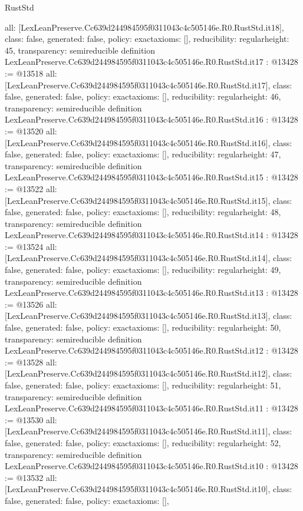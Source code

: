 \begin{lexlean}{RustStd}
\begin{coremodule}
{  all: [LexLeanPreserve.Cc639d244984595f0311043c4c505146e.R0.RustStd.it18],
  class: false,
  generated: false,
  policy: exact{axioms: []},
  reducibility: regular{height: 45},
  transparency: semireducible
}
definition LexLeanPreserve.Cc639d244984595f0311043c4c505146e.R0.RustStd.it17 : @13428 := @13518 {
  all: [LexLeanPreserve.Cc639d244984595f0311043c4c505146e.R0.RustStd.it17],
  class: false,
  generated: false,
  policy: exact{axioms: []},
  reducibility: regular{height: 46},
  transparency: semireducible
}
definition LexLeanPreserve.Cc639d244984595f0311043c4c505146e.R0.RustStd.it16 : @13428 := @13520 {
  all: [LexLeanPreserve.Cc639d244984595f0311043c4c505146e.R0.RustStd.it16],
  class: false,
  generated: false,
  policy: exact{axioms: []},
  reducibility: regular{height: 47},
  transparency: semireducible
}
definition LexLeanPreserve.Cc639d244984595f0311043c4c505146e.R0.RustStd.it15 : @13428 := @13522 {
  all: [LexLeanPreserve.Cc639d244984595f0311043c4c505146e.R0.RustStd.it15],
  class: false,
  generated: false,
  policy: exact{axioms: []},
  reducibility: regular{height: 48},
  transparency: semireducible
}
definition LexLeanPreserve.Cc639d244984595f0311043c4c505146e.R0.RustStd.it14 : @13428 := @13524 {
  all: [LexLeanPreserve.Cc639d244984595f0311043c4c505146e.R0.RustStd.it14],
  class: false,
  generated: false,
  policy: exact{axioms: []},
  reducibility: regular{height: 49},
  transparency: semireducible
}
definition LexLeanPreserve.Cc639d244984595f0311043c4c505146e.R0.RustStd.it13 : @13428 := @13526 {
  all: [LexLeanPreserve.Cc639d244984595f0311043c4c505146e.R0.RustStd.it13],
  class: false,
  generated: false,
  policy: exact{axioms: []},
  reducibility: regular{height: 50},
  transparency: semireducible
}
definition LexLeanPreserve.Cc639d244984595f0311043c4c505146e.R0.RustStd.it12 : @13428 := @13528 {
  all: [LexLeanPreserve.Cc639d244984595f0311043c4c505146e.R0.RustStd.it12],
  class: false,
  generated: false,
  policy: exact{axioms: []},
  reducibility: regular{height: 51},
  transparency: semireducible
}
definition LexLeanPreserve.Cc639d244984595f0311043c4c505146e.R0.RustStd.it11 : @13428 := @13530 {
  all: [LexLeanPreserve.Cc639d244984595f0311043c4c505146e.R0.RustStd.it11],
  class: false,
  generated: false,
  policy: exact{axioms: []},
  reducibility: regular{height: 52},
  transparency: semireducible
}
definition LexLeanPreserve.Cc639d244984595f0311043c4c505146e.R0.RustStd.it10 : @13428 := @13532 {
  all: [LexLeanPreserve.Cc639d244984595f0311043c4c505146e.R0.RustStd.it10],
  class: false,
  generated: false,
  policy: exact{axioms: []},
}
\end{coremodule}
\end{lexlean}

